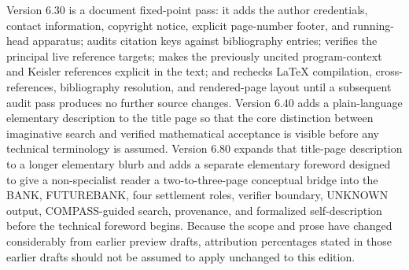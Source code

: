 \documentclass[11pt,openany]{book}
\theoremstyle{definition}
\theoremstyle{remark}
\begin{document}
Version 6.30 is a document fixed-point pass: it adds the author credentials, contact information, copyright notice, explicit page-number footer, and running-head apparatus; audits citation keys against bibliography entries; verifies the principal live reference targets; makes the previously uncited program-context and Keisler references explicit in the text; and rechecks LaTeX compilation, cross-references, bibliography resolution, and rendered-page layout until a subsequent audit pass produces no further source changes. Version 6.40 adds a plain-language elementary description to the title page so that the core distinction between imaginative search and verified mathematical acceptance is visible before any technical terminology is assumed. Version 6.80 expands that title-page description to a longer elementary blurb and adds a separate elementary foreword designed to give a non-specialist reader a two-to-three-page conceptual bridge into the BANK, FUTUREBANK, four settlement roles, verifier boundary, UNKNOWN output, COMPASS-guided search, provenance, and formalized self-description before the technical foreword begins. Because the scope and prose have changed considerably from earlier preview drafts, attribution percentages stated in those earlier drafts should not be assumed to apply unchanged to this edition.
\end{document}
